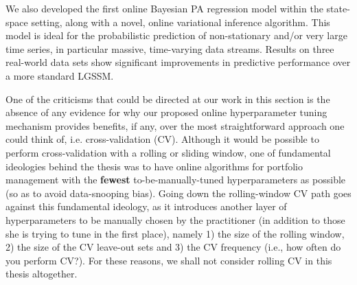 We also developed the first online Bayesian PA regression model within the state-space setting, along with a novel, online variational inference algorithm. This model is ideal for the probabilistic prediction of non-stationary and/or very large time series, in particular massive, time-varying data streams. Results on three real-world data sets show significant improvements in predictive performance over a more standard LGSSM.

\begin{mccorrection}
One of the criticisms that could be directed at our work in this section is the absence of any evidence for why our proposed online hyperparameter tuning mechanism provides benefits, if any, over the most straightforward approach one could think of, i.e. cross-validation (CV). Although it would be possible to perform cross-validation with a rolling or sliding window, one of fundamental ideologies behind the thesis was to have online algorithms for portfolio management with the \textbf{fewest} to-be-manually-tuned hyperparameters as possible (so as to avoid data-snooping bias). Going down the rolling-window CV path goes against this fundamental ideology, as it introduces another layer of hyperparameters to be manually chosen by the practitioner (in addition to those she is trying to tune in the first place), namely 1) the size of the rolling window, 2) the size of the CV leave-out sets and 3) the CV frequency (i.e., how often do you perform CV?). For these reasons, we shall not consider rolling CV in this thesis altogether.
\end{mccorrection}